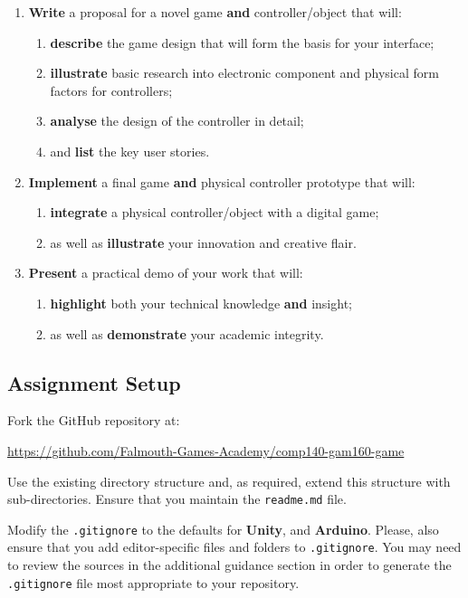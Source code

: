 \documentclass{../../fal_assignment}
\begin{document}
\begin{enumerate}[label=(\Alph*)]
	\item \textbf{Write} a proposal for a novel game \textbf{and} controller/object that will:
	\begin{enumerate}[label=\roman*.]
		\item \textbf{describe} the game design that will form the basis for your interface;
		\item \textbf{illustrate} basic  research into electronic component and physical form factors for controllers;
		\item \textbf{analyse} the design of the controller in detail;
		\item and \textbf{list} the key user stories.
	\end{enumerate}
	\item \textbf{Implement} a final game \textbf{and} physical controller prototype that will:
	\begin{enumerate}[label=\roman*.]
		\item \textbf{integrate} a physical controller/object with a digital game;
		\item as well as \textbf{illustrate} your innovation and creative flair.
	\end{enumerate}
	\item \textbf{Present} a practical demo of your work that will:
	\begin{enumerate}[label=\roman*.]
		\item \textbf{highlight} both your technical knowledge \textbf{and} insight;
		\item as well as \textbf{demonstrate} your academic integrity.
	\end{enumerate}
\end{enumerate}

\subsection*{Assignment Setup}

Fork the GitHub repository at:

\indent \url{https://github.com/Falmouth-Games-Academy/comp140-gam160-game}

Use the existing directory structure and, as required, extend this structure with sub-directories. Ensure that you maintain the \texttt{readme.md} file.

Modify the \texttt{.gitignore} to the defaults for \textbf{Unity}, and \textbf{Arduino}. Please, also ensure that you add editor-specific files and folders to \texttt{.gitignore}. You may need to review the sources in the additional guidance section in order to generate the \texttt{.gitignore} file most appropriate to your repository. 
\end{document}
